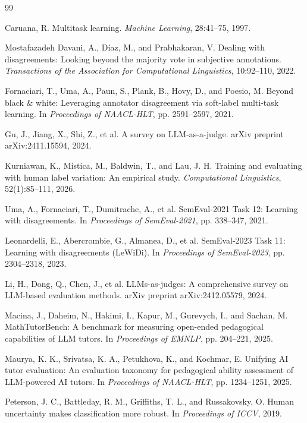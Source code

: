 \documentclass[UTF8,fontset=fandol,a4paper,11pt]{ctexart}
\begin{document}
\begin{thebibliography}{99}

Caruana, R. Multitask learning. \emph{Machine Learning}, 28:41--75, 1997.

Mostafazadeh Davani, A., Díaz, M., and Prabhakaran, V. Dealing with disagreements: Looking beyond the majority vote in subjective annotations. \emph{Transactions of the Association for Computational Linguistics}, 10:92--110, 2022.

Fornaciari, T., Uma, A., Paun, S., Plank, B., Hovy, D., and Poesio, M. Beyond black \& white: Leveraging annotator disagreement via soft-label multi-task learning. In \emph{Proceedings of NAACL-HLT}, pp. 2591--2597, 2021.

Gu, J., Jiang, X., Shi, Z., et al. A survey on LLM-as-a-judge. arXiv preprint arXiv:2411.15594, 2024.

Kurniawan, K., Mistica, M., Baldwin, T., and Lau, J. H. Training and evaluating with human label variation: An empirical study. \emph{Computational Linguistics}, 52(1):85--111, 2026.

Uma, A., Fornaciari, T., Dumitrache, A., et al. SemEval-2021 Task 12: Learning with disagreements. In \emph{Proceedings of SemEval-2021}, pp. 338--347, 2021.

Leonardelli, E., Abercrombie, G., Almanea, D., et al. SemEval-2023 Task 11: Learning with disagreements (LeWiDi). In \emph{Proceedings of SemEval-2023}, pp. 2304--2318, 2023.

Li, H., Dong, Q., Chen, J., et al. LLMs-as-judges: A comprehensive survey on LLM-based evaluation methods. arXiv preprint arXiv:2412.05579, 2024.

Macina, J., Daheim, N., Hakimi, I., Kapur, M., Gurevych, I., and Sachan, M. MathTutorBench: A benchmark for measuring open-ended pedagogical capabilities of LLM tutors. In \emph{Proceedings of EMNLP}, pp. 204--221, 2025.

Maurya, K. K., Srivatsa, K. A., Petukhova, K., and Kochmar, E. Unifying AI tutor evaluation: An evaluation taxonomy for pedagogical ability assessment of LLM-powered AI tutors. In \emph{Proceedings of NAACL-HLT}, pp. 1234--1251, 2025.

Peterson, J. C., Battleday, R. M., Griffiths, T. L., and Russakovsky, O. Human uncertainty makes classification more robust. In \emph{Proceedings of ICCV}, 2019.


\end{thebibliography}
\end{document}
